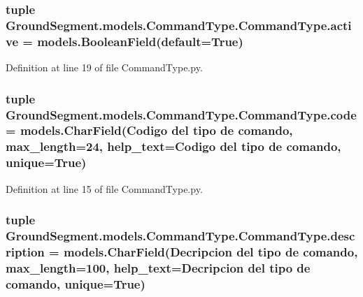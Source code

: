 \subsubsection[{active}]{\setlength{\rightskip}{0pt plus 5cm}tuple Ground\+Segment.\+models.\+Command\+Type.\+Command\+Type.\+active = models.\+Boolean\+Field(default=True)\hspace{0.3cm}{\ttfamily [static]}}\label{class_ground_segment_1_1models_1_1_command_type_1_1_command_type_a4fd1cf4f72c8b1bfd70917acaab44cfc}


Definition at line 19 of file Command\+Type.\+py.

\hypertarget{class_ground_segment_1_1models_1_1_command_type_1_1_command_type_ac77c0cba489bd7a6fdaa1b1708874788}{}
\subsubsection[{code}]{\setlength{\rightskip}{0pt plus 5cm}tuple Ground\+Segment.\+models.\+Command\+Type.\+Command\+Type.\+code = models.\+Char\+Field(\textquotesingle{}Codigo del tipo de comando\textquotesingle{}, max\+\_\+length=24, help\+\_\+text=\textquotesingle{}Codigo del tipo de comando\textquotesingle{}, unique=True)\hspace{0.3cm}{\ttfamily [static]}}\label{class_ground_segment_1_1models_1_1_command_type_1_1_command_type_ac77c0cba489bd7a6fdaa1b1708874788}


Definition at line 15 of file Command\+Type.\+py.

\hypertarget{class_ground_segment_1_1models_1_1_command_type_1_1_command_type_aaa9751ec3f77c395d30ccee44158b402}{}
\subsubsection[{description}]{\setlength{\rightskip}{0pt plus 5cm}tuple Ground\+Segment.\+models.\+Command\+Type.\+Command\+Type.\+description = models.\+Char\+Field(\textquotesingle{}Decripcion del tipo de comando\textquotesingle{}, max\+\_\+length=100, help\+\_\+text=\textquotesingle{}Decripcion del tipo de comando\textquotesingle{}, unique=True)\hspace{0.3cm}{\ttfamily [static]}}\label{class_ground_segment_1_1models_1_1_command_type_1_1_command_type_aaa9751ec3f77c395d30ccee44158b402}


